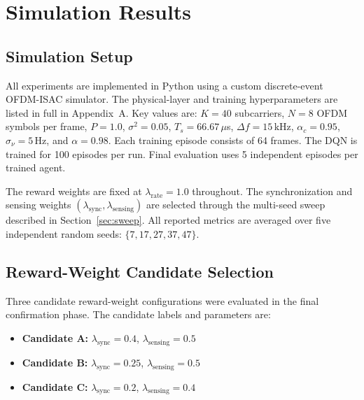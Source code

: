 \chapter{Simulation Results}
\label{ch:results}

\section{Simulation Setup}

All experiments are implemented in Python using a custom discrete-event OFDM-ISAC simulator. The physical-layer and training hyperparameters are listed in full in Appendix~A. Key values are: $K=40$ subcarriers, $N=8$ OFDM symbols per frame, $P=1.0$, $\sigma^2=0.05$, $T_s=66.67\,\mu$s, $\Delta f=15\,\text{kHz}$, $\alpha_c=0.95$, $\sigma_\nu=5\,\text{Hz}$, and $\alpha=0.98$. Each training episode consists of 64 frames. The DQN is trained for 100 episodes per run. Final evaluation uses 5 independent episodes per trained agent.

The reward weights are fixed at $\lambda_{\text{rate}}=1.0$ throughout. The synchronization and sensing weights $(\lambda_{\text{sync}}, \lambda_{\text{sensing}})$ are selected through the multi-seed sweep described in Section~\ref{sec:sweep}. All reported metrics are averaged over five independent random seeds: $\{7, 17, 27, 37, 47\}$.

\section{Reward-Weight Candidate Selection}

Three candidate reward-weight configurations were evaluated in the final confirmation phase. The candidate labels and parameters are:
\begin{itemize}
    \item \textbf{Candidate A:} $\lambda_{\text{sync}} = 0.4$, $\lambda_{\text{sensing}} = 0.5$
    \item \textbf{Candidate B:} $\lambda_{\text{sync}} = 0.25$, $\lambda_{\text{sensing}} = 0.5$
    \item \textbf{Candidate C:} $\lambda_{\text{sync}} = 0.2$, $\lambda_{\text{sensing}} = 0.4$
\end{itemize}

